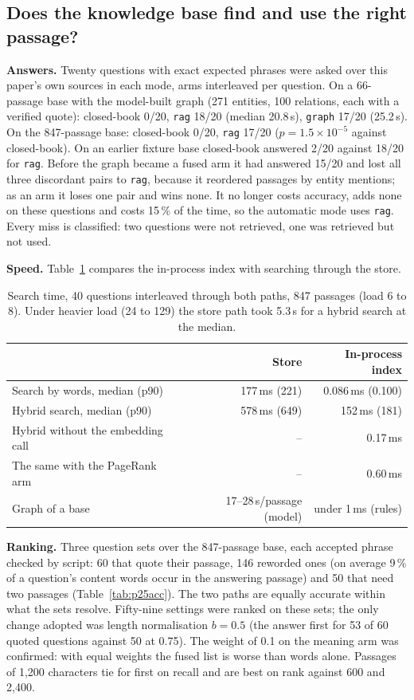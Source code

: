 \subsection{Does the knowledge base find and use the right passage?}
\label{sec:eval:knowledge}
\textbf{Answers.} Twenty questions with exact expected phrases were asked over
this paper's own sources in each mode, arms interleaved per question. On a
66-passage base with the model-built graph (271 entities, 100 relations, each
with a verified quote): closed-book 0/20, \texttt{rag} 18/20 (median 20.8\,s),
\texttt{graph} 17/20 (25.2\,s). On the 847-passage base: closed-book 0/20,
\texttt{rag} 17/20 ($p=1.5\times10^{-5}$ against closed-book). On an earlier
fixture base closed-book answered 2/20 against 18/20 for \texttt{rag}. Before
the graph became a fused arm it had answered 15/20 and lost all three
discordant pairs to \texttt{rag}, because it reordered passages by entity
mentions; as an arm it loses one pair and wins none. It no longer costs
accuracy, adds none on these questions and costs 15\,\% of the time, so the
automatic mode uses \texttt{rag}. Every miss is classified: two questions
were not retrieved, one was retrieved but not used.

\textbf{Speed.} Table~\ref{tab:p25time} compares the in-process index with
searching through the store.

\begin{table}[t]
\centering\scriptsize
\caption{Search time, 40 questions interleaved through both paths, 847 passages (load 6 to 8). Under heavier load (24 to 129) the store path took 5.3\,s for a hybrid search at the median.}
\label{tab:p25time}
\begin{tabular}{@{}p{3.1cm}rr@{}}
\toprule
 & Store & In-process index \\
\midrule
Search by words, median (p90) & 177\,ms (221) & 0.086\,ms (0.100) \\
Hybrid search, median (p90) & 578\,ms (649) & 152\,ms (181) \\
Hybrid without the embedding call & -- & 0.17\,ms \\
The same with the PageRank arm & -- & 0.60\,ms \\
Graph of a base & 17--28\,s/passage (model) & under 1\,ms (rules) \\
\bottomrule
\end{tabular}
\end{table}

\textbf{Ranking.} Three question sets over the 847-passage base, each
accepted phrase checked by script: 60 that quote their passage, 146 reworded
ones (on average 9\,\% of a question's content words occur in the answering
passage) and 50 that need two passages (Table~\ref{tab:p25acc}). The two
paths are equally accurate within what the sets resolve. Fifty-nine settings
were ranked on these sets; the only change adopted was length normalisation
$b=0.5$ (the answer first for 53 of 60 quoted questions against 50 at 0.75).
The weight of 0.1 on the meaning arm was confirmed: with equal weights the
fused list is worse than words alone. Passages of 1{,}200 characters tie for
first on recall and are best on rank against 600 and 2{,}400.

